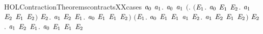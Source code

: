 \begin{SaveVerbatim}{HOLContractionTheoremscontractsXXcases}
\HOLTokenTurnstile{} \HOLSymConst{\HOLTokenForall{}}\ensuremath{\HOLBoundVar{a}\sb{\mathrm{0}}} \ensuremath{\HOLBoundVar{a}\sb{\mathrm{1}}}.
     \ensuremath{\HOLBoundVar{a}\sb{\mathrm{0}}}  \ensuremath{\HOLBoundVar{a}\sb{\mathrm{1}}} \HOLSymConst{\HOLTokenEquiv{}}
     \ensuremath{(}\HOLSymConst{\HOLTokenForall{}}. \ensuremath{(}\HOLSymConst{\HOLTokenForall{}}\ensuremath{\HOLBoundVar{E}\sb{\mathrm{1}}}.
             \ensuremath{\HOLBoundVar{a}\sb{\mathrm{0}}} \HOLTokenTransBegin{} \HOLTokenTransEnd \ensuremath{\HOLBoundVar{E}\sb{\mathrm{1}}} \HOLSymConst{\HOLTokenImp{}}
             \HOLSymConst{\HOLTokenExists{}}\ensuremath{\HOLBoundVar{E}\sb{\mathrm{2}}}. \ensuremath{\HOLBoundVar{a}\sb{\mathrm{1}}} \HOLTokenTransBegin{} \HOLTokenTransEnd \ensuremath{\HOLBoundVar{E}\sb{\mathrm{2}}} \HOLSymConst{\HOLTokenConj{}} \ensuremath{\HOLBoundVar{E}\sb{\mathrm{1}}}  \ensuremath{\HOLBoundVar{E}\sb{\mathrm{2}}}\ensuremath{)} \HOLSymConst{\HOLTokenConj{}}
          \HOLSymConst{\HOLTokenForall{}}\ensuremath{\HOLBoundVar{E}\sb{\mathrm{2}}}.
            \ensuremath{\HOLBoundVar{a}\sb{\mathrm{1}}} \HOLTokenTransBegin{} \HOLTokenTransEnd \ensuremath{\HOLBoundVar{E}\sb{\mathrm{2}}} \HOLSymConst{\HOLTokenImp{}}
            \HOLSymConst{\HOLTokenExists{}}\ensuremath{\HOLBoundVar{E}\sb{\mathrm{1}}}. \ensuremath{\HOLBoundVar{a}\sb{\mathrm{0}}} \HOLTokenWeakTransBegin{} \HOLTokenWeakTransEnd \ensuremath{\HOLBoundVar{E}\sb{\mathrm{1}}} \HOLSymConst{\HOLTokenConj{}}  \ensuremath{\HOLBoundVar{E}\sb{\mathrm{1}}} \ensuremath{\HOLBoundVar{E}\sb{\mathrm{2}}}\ensuremath{)} \HOLSymConst{\HOLTokenConj{}}
     \ensuremath{(}\HOLSymConst{\HOLTokenForall{}}\ensuremath{\HOLBoundVar{E}\sb{\mathrm{1}}}.
        \ensuremath{\HOLBoundVar{a}\sb{\mathrm{0}}} \HOLTokenTransBegin\HOLConst{\ensuremath{\tau}}\HOLTokenTransEnd \ensuremath{\HOLBoundVar{E}\sb{\mathrm{1}}} \HOLSymConst{\HOLTokenImp{}}
        \ensuremath{\HOLBoundVar{E}\sb{\mathrm{1}}}  \ensuremath{\HOLBoundVar{a}\sb{\mathrm{1}}} \HOLSymConst{\HOLTokenDisj{}} \HOLSymConst{\HOLTokenExists{}}\ensuremath{\HOLBoundVar{E}\sb{\mathrm{2}}}. \ensuremath{\HOLBoundVar{a}\sb{\mathrm{1}}} \HOLTokenTransBegin\HOLConst{\ensuremath{\tau}}\HOLTokenTransEnd \ensuremath{\HOLBoundVar{E}\sb{\mathrm{2}}} \HOLSymConst{\HOLTokenConj{}} \ensuremath{\HOLBoundVar{E}\sb{\mathrm{1}}}  \ensuremath{\HOLBoundVar{E}\sb{\mathrm{2}}}\ensuremath{)} \HOLSymConst{\HOLTokenConj{}}
     \HOLSymConst{\HOLTokenForall{}}\ensuremath{\HOLBoundVar{E}\sb{\mathrm{2}}}. \ensuremath{\HOLBoundVar{a}\sb{\mathrm{1}}} \HOLTokenTransBegin\HOLConst{\ensuremath{\tau}}\HOLTokenTransEnd \ensuremath{\HOLBoundVar{E}\sb{\mathrm{2}}} \HOLSymConst{\HOLTokenImp{}} \HOLSymConst{\HOLTokenExists{}}\ensuremath{\HOLBoundVar{E}\sb{\mathrm{1}}}.  \ensuremath{\HOLBoundVar{a}\sb{\mathrm{0}}} \ensuremath{\HOLBoundVar{E}\sb{\mathrm{1}}} \HOLSymConst{\HOLTokenConj{}}  \ensuremath{\HOLBoundVar{E}\sb{\mathrm{1}}} \ensuremath{\HOLBoundVar{E}\sb{\mathrm{2}}}
\end{SaveVerbatim}
